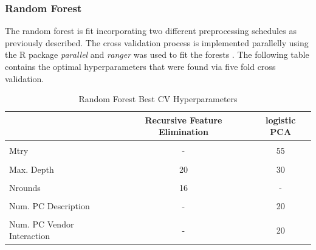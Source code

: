 \documentclass[a4paper,12pt, headsepline]{scrartcl}
\numberwithin{equation}{section}
\begin{document}
\subsubsection{Random Forest}
The random forest is fit incorporating two different preprocessing schedules as previously described. The cross validation process is implemented parallelly using the R package \textit{parallel} and \textit{ranger} was used to fit the forests \citep{ranger, R}. The following table contains the optimal hyperparameters that were found via five fold cross validation.

\begin{table}[H]
	\centering
	\begin{tabular}[t]{lcc}
		\toprule
		& Recursive Feature Elimination & logistic PCA \\
		\midrule
		\cellcolor{gray!6}{Node Feature Share} & \cellcolor{gray!6}{85\%} & \cellcolor{gray!6}{-}\\
		Mtry & - & 55\\
		\cellcolor{gray!6}{Min. Node Size} & \cellcolor{gray!6}{3} & \cellcolor{gray!6}{1}\\
		Max. Depth & 20 & 30\\
		\cellcolor{gray!6}{Num. Trees} & \cellcolor{gray!6}{1500} & \cellcolor{gray!6}{1000}\\
		Nrounds & 16 & -\\
		\cellcolor{gray!6}{Covariate Share} & \cellcolor{gray!6}{75\%} & \cellcolor{gray!6}{-}\\
		Num. PC Description & - & 20\\
		\cellcolor{gray!6}{Num. PC Vendors} & \cellcolor{gray!6}{-} & \cellcolor{gray!6}{10}\\
		Num. PC Vendor Interaction & - & 20\\
		\bottomrule
	\end{tabular}
	\caption{Random Forest Best CV Hyperparameters}\label{tab:RF}
\end{table}
\end{document}
